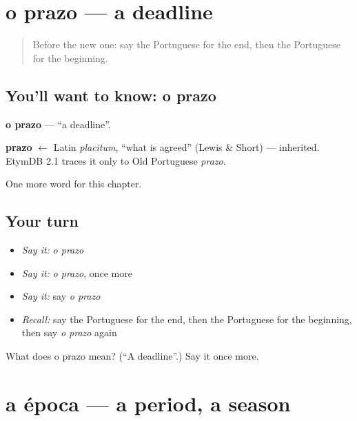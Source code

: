 \section[o prazo]{o prazo — a deadline}

\label{lesson:PT-C212-prazo}



\begin{quote}
Before the new one: say the Portuguese for the end, then the Portuguese for the beginning.
\end{quote}

\subsection*{You'll want to know: o prazo}
\textbf{o prazo} — \textquotedblleft{}a deadline\textquotedblright{}.

\begin{cousinweb}
\textbf{prazo} $\leftarrow$ Latin \emph{placitum}, \textquotedblleft{}what is agreed\textquotedblright{} (Lewis \& Short) — inherited. EtymDB 2.1 traces it only to Old Portuguese \emph{prazo}.
\end{cousinweb}

\begin{grammarlens}[title={What you've built}]
One more word for this chapter.
\end{grammarlens}

\subsection*{Your turn}
\begin{itemize}
\raggedright
  \item \emph{Say it:} \emph{o prazo}
  \item \emph{Say it:} \emph{o prazo}, once more
  \item \emph{Say it:} say \emph{o prazo}
  \item \emph{Recall:} say the Portuguese for the end, then the Portuguese for the beginning, then say \emph{o prazo} again
\end{itemize}

\begin{tcolorbox}[breakable,colback=teal!4,colframe=teal!35!black,title={Before you move on}]
What does o prazo mean? (\textquotedblleft{}A deadline\textquotedblright{}.) Say it once more.
\end{tcolorbox}
\section[a época]{a época — a period, a season}

